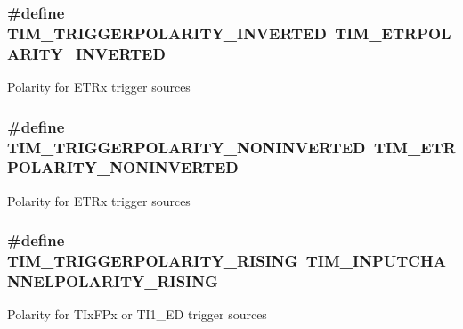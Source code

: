 \subsubsection[{\texorpdfstring{T\+I\+M\+\_\+\+T\+R\+I\+G\+G\+E\+R\+P\+O\+L\+A\+R\+I\+T\+Y\+\_\+\+I\+N\+V\+E\+R\+T\+ED}{TIM_TRIGGERPOLARITY_INVERTED}}]{\setlength{\rightskip}{0pt plus 5cm}\#define T\+I\+M\+\_\+\+T\+R\+I\+G\+G\+E\+R\+P\+O\+L\+A\+R\+I\+T\+Y\+\_\+\+I\+N\+V\+E\+R\+T\+ED~{\bf T\+I\+M\+\_\+\+E\+T\+R\+P\+O\+L\+A\+R\+I\+T\+Y\+\_\+\+I\+N\+V\+E\+R\+T\+ED}}\hypertarget{group___t_i_m___trigger___polarity_ga64337379c3762dca395b812c65656de4}{}\label{group___t_i_m___trigger___polarity_ga64337379c3762dca395b812c65656de4}
Polarity for E\+T\+Rx trigger sources 
\subsubsection[{\texorpdfstring{T\+I\+M\+\_\+\+T\+R\+I\+G\+G\+E\+R\+P\+O\+L\+A\+R\+I\+T\+Y\+\_\+\+N\+O\+N\+I\+N\+V\+E\+R\+T\+ED}{TIM_TRIGGERPOLARITY_NONINVERTED}}]{\setlength{\rightskip}{0pt plus 5cm}\#define T\+I\+M\+\_\+\+T\+R\+I\+G\+G\+E\+R\+P\+O\+L\+A\+R\+I\+T\+Y\+\_\+\+N\+O\+N\+I\+N\+V\+E\+R\+T\+ED~{\bf T\+I\+M\+\_\+\+E\+T\+R\+P\+O\+L\+A\+R\+I\+T\+Y\+\_\+\+N\+O\+N\+I\+N\+V\+E\+R\+T\+ED}}\hypertarget{group___t_i_m___trigger___polarity_gad985881cdfddb63dfc52e6aaca776ff6}{}\label{group___t_i_m___trigger___polarity_gad985881cdfddb63dfc52e6aaca776ff6}
Polarity for E\+T\+Rx trigger sources 
\subsubsection[{\texorpdfstring{T\+I\+M\+\_\+\+T\+R\+I\+G\+G\+E\+R\+P\+O\+L\+A\+R\+I\+T\+Y\+\_\+\+R\+I\+S\+I\+NG}{TIM_TRIGGERPOLARITY_RISING}}]{\setlength{\rightskip}{0pt plus 5cm}\#define T\+I\+M\+\_\+\+T\+R\+I\+G\+G\+E\+R\+P\+O\+L\+A\+R\+I\+T\+Y\+\_\+\+R\+I\+S\+I\+NG~{\bf T\+I\+M\+\_\+\+I\+N\+P\+U\+T\+C\+H\+A\+N\+N\+E\+L\+P\+O\+L\+A\+R\+I\+T\+Y\+\_\+\+R\+I\+S\+I\+NG}}\hypertarget{group___t_i_m___trigger___polarity_ga64b521aa367d745ec00a763449634ace}{}\label{group___t_i_m___trigger___polarity_ga64b521aa367d745ec00a763449634ace}
Polarity for T\+Ix\+F\+Px or T\+I1\+\_\+\+ED trigger sources 